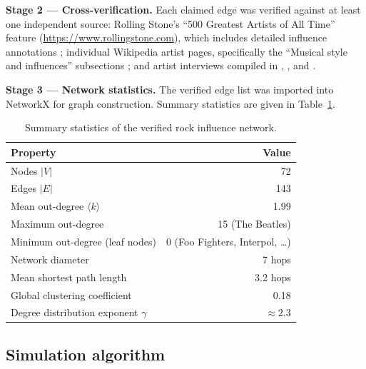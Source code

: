 \documentclass[12pt, a4paper]{article}
\begin{document}
\textbf{Stage 2 — Cross-verification.}
Each claimed edge was verified against at least one independent
source: Rolling Stone's ``500 Greatest Artists of All Time''
feature (\url{https://www.rollingstone.com}), which includes
detailed influence annotations \citep{rollingstoneartists};
individual Wikipedia artist pages, specifically the
``Musical style and influences'' subsections
\citep{wikifluence2024}; and artist interviews compiled in
\citet{cross2001}, \citet{azerrad1994}, and \citet{shadwick2003}.

\textbf{Stage 3 — Network statistics.}
The verified edge list was imported into NetworkX \citep{networkx2008}
for graph construction.
Summary statistics are given in Table~\ref{tab:netstats}.

\begin{table}[H]
\centering
\caption{Summary statistics of the verified rock influence network.}
\label{tab:netstats}
\small
\begin{tabular}{lr}
\toprule
\textbf{Property} & \textbf{Value} \\
\midrule
Nodes $|V|$                            & 72     \\
Edges $|E|$                            & 143    \\
Mean out-degree $\langle k \rangle$    & 1.99   \\
Maximum out-degree                     & 15 (The Beatles) \\
Minimum out-degree (leaf nodes)        & 0 (Foo Fighters, Interpol, \ldots) \\
Network diameter                       & 7 hops \\
Mean shortest path length              & 3.2 hops \\
Global clustering coefficient          & 0.18 \\
Degree distribution exponent $\gamma$  & $\approx 2.3$ \\
\bottomrule
\end{tabular}
\end{table}

\subsection{Simulation algorithm}
\end{document}
